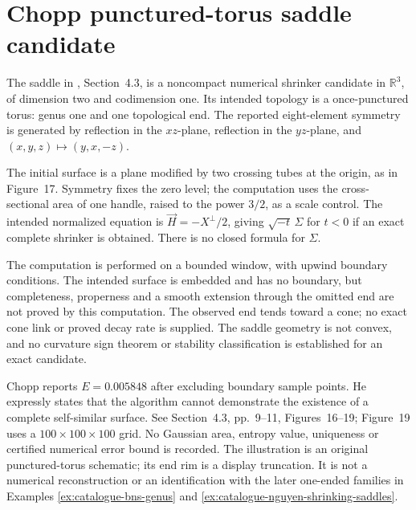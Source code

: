 \chapter{Chopp punctured-torus saddle candidate}\label{sec:catalogue-chopp-saddle}
\begin{example}\label{ex:catalogue-chopp-saddle}
The saddle in \cite{CatChopp1994}, Section~4.3, is a noncompact numerical
shrinker candidate in $\mathbb R^3$, of dimension two and codimension one.
Its intended topology is a once-punctured torus: genus one and one
topological end. The reported eight-element symmetry is generated by
reflection in the $xz$-plane, reflection in the $yz$-plane, and
$(x,y,z)\mapsto(y,x,-z)$.

The initial surface is a plane modified by two crossing tubes at the
origin, as in Figure~17. Symmetry fixes the zero level; the computation
uses the cross-sectional area of one handle, raised to the power $3/2$,
as a scale control. The intended normalized equation is
$\vec H=-X^\perp/2$, giving $\sqrt{-t}\,\Sigma$ for $t<0$ if an exact
complete shrinker is obtained. There is no closed formula for $\Sigma$.

The computation is performed on a bounded window, with upwind boundary
conditions. The intended surface is embedded and has no boundary, but
completeness, properness and a smooth extension through the omitted end
are not proved by this computation. The observed end tends toward a cone;
no exact cone link or proved decay rate is supplied. The saddle geometry
is not convex, and no curvature sign theorem or stability classification
is established for an exact candidate.

Chopp reports $E=0.005848$ after excluding boundary sample points.
He expressly states that the algorithm cannot demonstrate the existence
of a complete self-similar surface. See Section~4.3, pp.~9--11,
Figures~16--19; Figure~19 uses a $100\times100\times100$ grid.
No Gaussian area, entropy value, uniqueness or certified numerical error
bound is recorded. The illustration is an original punctured-torus
schematic; its end rim is a display truncation. It is not a numerical
reconstruction or an identification with the later one-ended families
in Examples \ref{ex:catalogue-bns-genus} and
\ref{ex:catalogue-nguyen-shrinking-saddles}.
\end{example}

